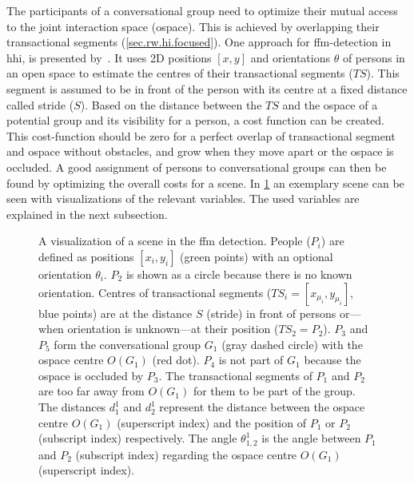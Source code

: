 The participants of a \gls{conversational group} need to optimize their mutual access to the joint interaction space (\gls{ospace}).
This is achieved by overlapping their \glspl{transactional segment} (\cref{sec.rw.hi.focused}).
One approach for \gls{ffm}-detection in \gls{hhi}, is presented by~.
It uses 2D positions \([x,y]\) and orientations \(\theta\) of persons in an open space to estimate the centres of their \glspl{transactional segment} (\(TS\)).
This segment is assumed to be in front of the person with its centre at a fixed distance called \gls{stride} (\(S\)).
Based on the distance between the \(TS\) and the \gls{ospace} of a potential group and its visibility for a person, a cost function can be created.
This cost-function should be zero for a perfect overlap of \gls{transactional segment} and \gls{ospace} without obstacles, and grow when they move apart or the \gls{ospace} is occluded.
A good assignment of persons to \glspl{conversational group} can then be found by optimizing the overall costs for a scene. 
In \cref{fig:ffm.approach} an exemplary scene can be seen with visualizations of the relevant variables.
The used variables are explained in the next subsection.
\begin{figure}[htbp]
    \centering
    \def\svgwidth{1.0\textwidth}
    
    \caption[F-Formation detection scene.]{\label{fig:ffm.approach}
    A visualization of a scene in the \gls{ffm} detection.
    People (\(P_i\)) are defined as positions \([ x_i, y_i ]\) (green points) with an optional orientation \(\theta_i\).
    \(P_2\) is shown as a circle because there is no known orientation.
    Centres of \glspl{transactional segment} (\(TS_i = [x_{\mu_i},y_{\mu_i}]\), blue points) are at the distance \(S\) (\gls{stride}) in front of persons or---when orientation is unknown---at their position (\(TS_2=P_2\)).
    \(P_3\) and \(P_5\) form the \gls{conversational group} \(G_1\) (gray dashed circle) with the \gls{ospace} centre \(O(G_1)\) (red dot).
    \(P_4\) is not part of \(G_1\) because the \gls{ospace} is occluded by \(P_3\).
    The \glspl{transactional segment} of \(P_1\) and \(P_2\) are too far away from \(O(G_1)\) for them to be part of the group.
    The distances \(d^1_1\) and \(d^1_2\) represent the distance between the \gls{ospace} centre \(O(G_1)\) (superscript index) and the position of \(P_1\) or \(P_2\) (subscript index) respectively.
    The angle \(\theta^1_{1,2}\) is the angle between \(P_1\) and \(P_2\) (subscript index) regarding the \gls{ospace} centre \(O(G_1)\) (superscript index).
    }
\end{figure}

